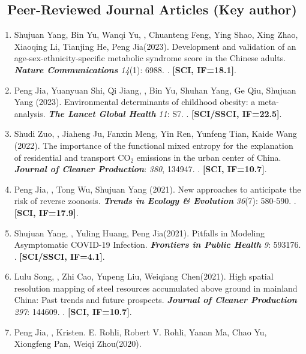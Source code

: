 \subsection*{\texorpdfstring{\faBook\ Peer-Reviewed Journal Articles (Key author)}{Peer-Reviewed Journal Articles (Key author)}}
\begin{enumerate}
\item
    Shujuan Yang, Bin Yu, Wanqi Yu, \Shaoqing, Chuanteng Feng, Ying Shao, Xing Zhao, Xiaoqing Li, Tianjing He, Peng Jia\CS (2023).
    Development and validation of an age-sex-ethnicity-specific metabolic syndrome score in the Chinese adults.
    \textbf{\textit{Nature Communications}} \textit{14}(1): 6988.
    . \textbf{[SCI, IF=18.1]}.
\item
    Peng Jia\CS, Yuanyuan Shi, Qi Jiang, \Shaoqing, Bin Yu, Shuhan Yang, Ge Qiu, Shujuan Yang (2023).
    Environmental determinants of childhood obesity: a meta-analysis.
    \textbf{\textit{The Lancet Global Health}} \textit{11}: S7.
    . \textbf{[SCI/SSCI, IF=22.5]}.
\item
    Shudi Zuo\CS, \Shaoqing, Jiaheng Ju, Fanxin Meng, Yin Ren, Yunfeng Tian, Kaide Wang (2022).
    The importance of the functional mixed entropy for the explanation of residential and transport CO$_2$ emissions in the urban center of China.
    \textbf{\textit{Journal of Cleaner Production}}: \textit{380}, 134947.
    . \textbf{[SCI, IF=10.7]}.
\item
    Peng Jia\CS, \Shaoqing, Tong Wu, Shujuan Yang (2021).
    New approaches to anticipate the risk of reverse zoonosis.
    \textbf{\textit{Trends in Ecology \& Evolution}} \textit{36}(7): 580-590.
    . \textbf{[SCI, IF=17.9]}.
\item
    Shujuan Yang, \Shaoqing, Yuling Huang, Peng Jia\CS (2021).
    Pitfalls in Modeling Asymptomatic COVID-19 Infection.
    \textbf{\textit{Frontiers in Public Health}} \textit{9}: 593176.
    . \textbf{[SCI/SSCI, IF=4.1]}.
\item
    Lulu Song, \Shaoqing, Zhi Cao, Yupeng Liu, Weiqiang Chen\CS (2021).
    High spatial resolution mapping of steel resources accumulated above ground in mainland China: Past trends and future prospects.
    \textbf{\textit{Journal of Cleaner Production}} \textit{297}: 144609.
    . \textbf{[SCI, IF=10.7]}.
\item
    Peng Jia\CS, \Shaoqing, Kristen. E. Rohli, Robert V. Rohli, Yanan Ma, Chao Yu, Xiongfeng Pan, Weiqi Zhou\CS (2020).

\end{enumerate}
